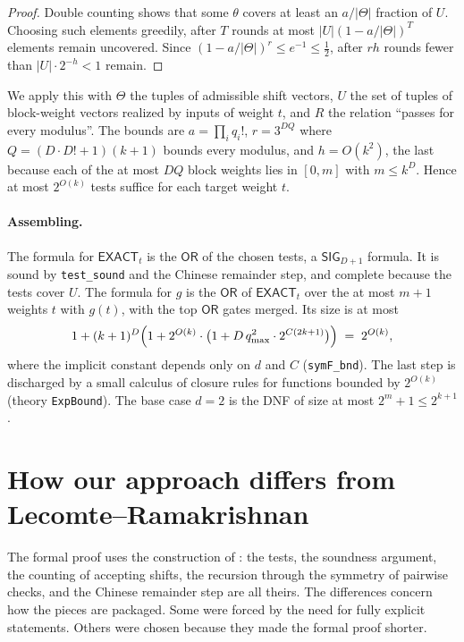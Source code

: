 \documentclass[11pt]{article}
\newcommand{\isa}[1]{\texttt{#1}}
\newcommand{\sig}{\mathsf{SIG}}
\newcommand{\EXACT}{\mathsf{EXACT}}
\newcommand{\OR}{\mathsf{OR}}
\begin{document}
\begin{proof}
Double counting shows that some $\theta$ covers at least an $a/|\Theta|$ fraction of $U$. Choosing such elements greedily, after $T$ rounds at most $|U|(1 - a/|\Theta|)^T$ elements remain uncovered. Since $(1 - a/|\Theta|)^r \le e^{-1} \le \tfrac12$, after $rh$ rounds fewer than $|U| \cdot 2^{-h} < 1$ remain.
\end{proof}

We apply this with $\Theta$ the tuples of admissible shift vectors, $U$ the set of tuples of block-weight vectors realized by inputs of weight $t$, and $R$ the relation ``passes for every modulus''. The bounds are $a = \prod_i q_i!$, $r = 3^{DQ}$ where $Q = (D \cdot D! + 1)(k+1)$ bounds every modulus, and $h = O(k^2)$, the last because each of the at most $DQ$ block weights lies in $[0, m]$ with $m \le k^D$. Hence at most $2^{O(k)}$ tests suffice for each target weight $t$.

\paragraph{Assembling.} The formula for $\EXACT_t$ is the $\OR$ of the chosen tests, a $\sig_{D+1}$ formula. It is sound by \isa{test\_sound} and the Chinese remainder step, and complete because the tests cover $U$. The formula for $g$ is the $\OR$ of $\EXACT_t$ over the at most $m+1$ weights $t$ with $g(t)$, with the top $\OR$ gates merged. Its size is at most
\[ 1 + (k+1)^D \Bigl(1 + 2^{O(k)} \cdot \bigl(1 + D\,q_{\max}^2 \cdot 2^{C(2k+1)}\bigr)\Bigr) \;=\; 2^{O(k)}, \]
where the implicit constant depends only on $d$ and $C$ (\isa{symF\_bnd}). The last step is discharged by a small calculus of closure rules for functions bounded by $2^{O(k)}$ (theory \isa{ExpBound}). The base case $d = 2$ is the DNF of size at most $2^m + 1 \le 2^{k+1}$.

\section{How our approach differs from Lecomte--Ramakrishnan}
\label{sec:differences}

The formal proof uses the construction of \citet{LR26}: the tests, the soundness argument, the counting of accepting shifts, the recursion through the symmetry of pairwise checks, and the Chinese remainder step are all theirs. The differences concern how the pieces are packaged. Some were forced by the need for fully explicit statements. Others were chosen because they made the formal proof shorter.
\end{document}
